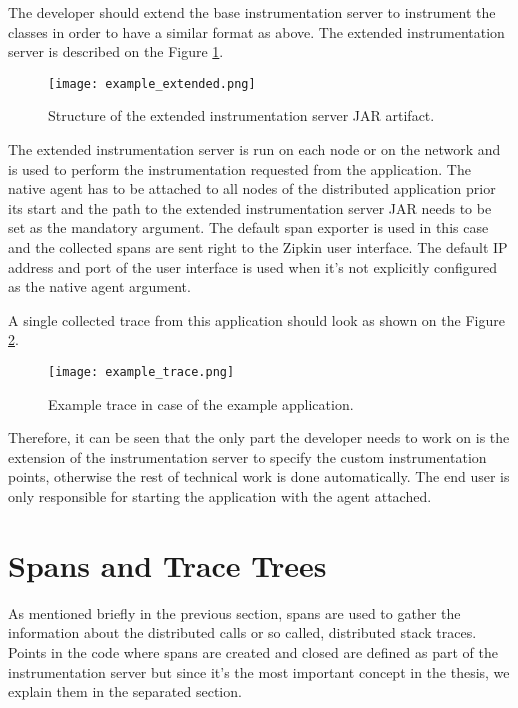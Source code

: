 The developer should extend the base instrumentation server to instrument the classes in order to have a similar format as above. The extended instrumentation server is described on the Figure \ref{fig:example_extended}.

	\begin{figure}
		\centering
		\texttt{[image: example\_extended.png]}
		\caption{Structure of the extended instrumentation server JAR artifact.}
		\label{fig:example_extended}
	\end{figure}

The extended instrumentation server is run on each node or on the network and is used to perform the instrumentation requested from the application. The native agent has to be attached to all nodes of the distributed application prior its start and the path to the extended instrumentation server JAR needs to be set as the mandatory argument. The default span exporter is used in this case and the collected spans are sent right to the Zipkin user interface. The default IP address and port of the user interface is used when it's not explicitly configured as the native agent argument.

A single collected trace from this application should look as shown on the Figure \ref{fig:example_trace}.

	\begin{figure}
		\centering
		\texttt{[image: example\_trace.png]}
		\caption{Example trace in case of the example application.}
		\label{fig:example_trace}
	\end{figure}

Therefore, it can be seen that the only part the developer needs to work on is the extension of the instrumentation server to specify the custom instrumentation points, otherwise the rest of technical work is done automatically. The end user is only responsible for starting the application with the agent attached.

\section{Spans and Trace Trees}
\label{subsec:spans}
As mentioned briefly in the previous section, spans are used to gather the information about the distributed calls or so called, distributed stack traces. Points in the code where spans are created and closed are defined as part of the instrumentation server but since it's the most important concept in the thesis, we explain them in the separated section. 

